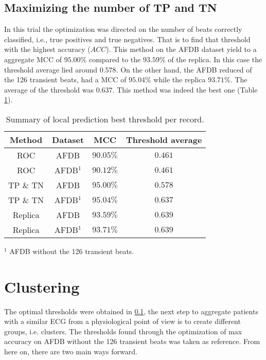 \subsection{Maximizing the number of TP and TN}
\label{sec:max_accuracy}
In this trial the optimization was directed on the number of beats correctly classified, i.e., true positives and true negatives. That is to find that threshold with the highest accuracy ($ACC$). This method on the AFDB dataset yield to a aggregate MCC of $95.00\%$ compared to the $93.59\%$ of the replica. In this case the threshold average lied around $0.578$. On the other hand, the AFDB reduced of the 126 transient beats, had a MCC of $95.04\%$ while the replica $93.71\%$. The average of the threshold was $0.637$. This method was indeed the best one (Table \ref{table:local_threshold_summary}).
\begin{table}[h]
\begin{center}
\begin{threeparttable}
\caption{Summary of local prediction best threshold per record.}
\label{table:local_threshold_summary}
\scriptsize
  \begin{tabular}{c c c c}
  \toprule
  \textbf{Method} & \textbf{Dataset} & \textbf{MCC} & \textbf{Threshold average} \\
  \midrule  
  ROC & AFDB & $90.05\%$ & $0.461$\\
  ROC & AFDB$^1$ & $90.12\%$ & $0.461$\\
  \hline
  TP \& TN & AFDB & $95.00\%$ & $0.578$\\
  TP \& TN & AFDB$^1$ & $95.04\%$ & $0.637$\\
  \hline
  Replica & AFDB & $93.59\%$ & $0.639$\\
  Replica & AFDB$^1$ & $93.71\%$ & $0.639$\\
  \bottomrule
\end{tabular}
\begin{tablenotes}
	\item $^1$ AFDB without the 126 transient beats.
    \end{tablenotes}
\end{threeparttable}
\end{center}
\end{table}

\section{Clustering}
The optimal thresholds were obtained in \ref{sec:max_accuracy}, the next step to aggregate patients with a similar ECG from a physiological point of view is to create different groups, i.e. clusters. The thresholds found through the optimization of max accuracy on AFDB without the 126 transient beats was taken as reference. From here on, there are two main ways forward. 

